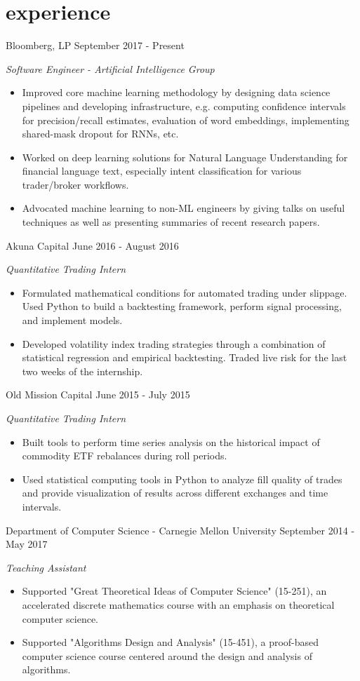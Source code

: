 \documentclass[print]{friggeri-cv} %
\begin{document}
\section{experience}

\begin{entrylist}

\entry
{Bloomberg, LP}
{September 2017 - Present}
{\emph{Software Engineer - Artificial Intelligence Group}
\begin{itemize}
\item Improved core machine learning methodology by designing data science pipelines and developing infrastructure, e.g. computing confidence intervals for precision/recall estimates,  evaluation of word embeddings, implementing shared-mask dropout for RNNs, etc.
\item Worked on deep learning solutions for Natural Language Understanding for financial language text, especially intent classification for various trader/broker workflows.
\item Advocated machine learning to non-ML engineers by giving talks on useful techniques as well as presenting summaries of recent research papers.
\end{itemize}}
\entry
{Akuna Capital}
{June 2016 - August 2016}
{\emph{Quantitative Trading Intern}
\begin{itemize}
\item Formulated mathematical conditions for automated trading under slippage. Used Python to build a backtesting framework, perform signal processing, and implement models. 
\item Developed volatility index trading strategies through a combination of statistical regression and empirical backtesting. Traded live risk for the last two weeks of the internship. 
\end{itemize}}
\entry
{Old Mission Capital}
{June 2015 - July 2015}
{\emph{Quantitative Trading Intern}
\begin{itemize}
\item Built tools to perform time series analysis on the historical impact of commodity ETF rebalances during roll periods. 
\item Used statistical computing tools in Python to analyze fill quality of trades and provide visualization of results across different exchanges and time intervals.
\end{itemize}}
\entry
{Department of Computer Science - Carnegie Mellon University}
{September 2014 - May 2017}
{\emph{Teaching Assistant}
\begin{itemize}
\item Supported "Great Theoretical Ideas of Computer Science" (15-251), an accelerated discrete mathematics course with an emphasis on theoretical computer science.
\item Supported "Algorithms Design and Analysis" (15-451), a proof-based computer science course centered around the design and analysis of algorithms.
\end{itemize}}


\end{entrylist}
\end{document}
